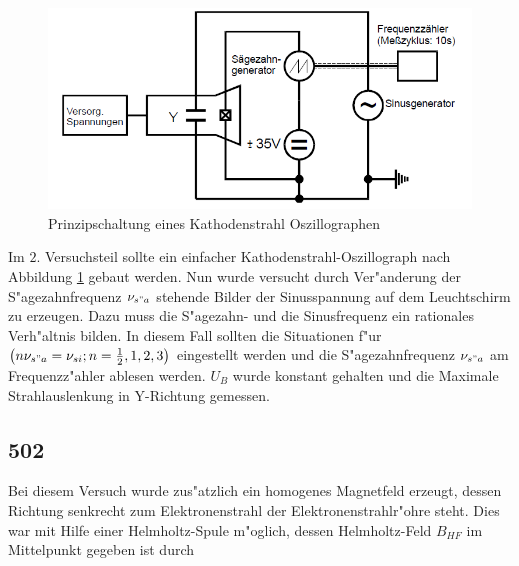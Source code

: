 		\begin{figure}[h]
			\centering
			\includegraphics[width = 14cm]{501b.png}
			\caption{Prinzipschaltung eines Kathodenstrahl Oszillographen}
			\label{501b}
		\end{figure}

		Im $2.$ Versuchsteil sollte ein einfacher Kathodenstrahl-Oszillograph nach Abbildung \ref{501b} gebaut werden.
		Nun wurde versucht durch Ver"anderung der S"agezahnfrequenz $\nu_{s"a}$ stehende Bilder der Sinusspannung auf dem Leuchtschirm zu erzeugen.
		Dazu muss die S"agezahn- und die Sinusfrequenz ein rationales Verh"altnis bilden. In diesem Fall sollten die Situationen f"ur $\left( n\nu_{s"a} = \nu_{si}; n = \frac{1}{2}, 1, 2, 3 \right)$ eingestellt werden und die S"agezahnfrequenz $\nu_{s"a}$ am Fre\-quenz\-z"ah\-ler ablesen werden.
		$U_B$ wurde konstant gehalten und die Maximale Strahlauslenkung in Y-Richtung gemessen.

	\subsection{502} 
	\label{sub:502}
		
		Bei diesem Versuch wurde zus"atzlich ein homogenes Magnetfeld erzeugt, dessen Richtung senkrecht zum Elektronenstrahl der Elektronenstrahlr"ohre steht. Dies war mit Hilfe einer Helmholtz-Spule m"oglich, dessen Helmholtz-Feld $B_{HF}$ im Mittelpunkt gegeben ist durch

